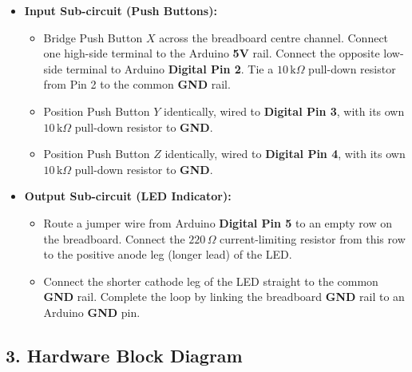 \documentclass[12pt, a4paper]{article}
\begin{document}
\begin{itemize}
  \item \textbf{Input Sub-circuit (Push Buttons):}
  \begin{itemize}
    \item Bridge Push Button $X$ across the breadboard centre channel.
          Connect one high-side terminal to the Arduino \textbf{5V} rail.
          Connect the opposite low-side terminal to Arduino
          \textbf{Digital Pin 2}. Tie a $10\,\text{k}\Omega$ pull-down
          resistor from Pin 2 to the common \textbf{GND} rail.
    \item Position Push Button $Y$ identically, wired to
          \textbf{Digital Pin 3}, with its own $10\,\text{k}\Omega$
          pull-down resistor to \textbf{GND}.
    \item Position Push Button $Z$ identically, wired to
          \textbf{Digital Pin 4}, with its own $10\,\text{k}\Omega$
          pull-down resistor to \textbf{GND}.
  \end{itemize}
  \item \textbf{Output Sub-circuit (LED Indicator):}
  \begin{itemize}
    \item Route a jumper wire from Arduino \textbf{Digital Pin 5} to an
          empty row on the breadboard. Connect the $220\,\Omega$
          current-limiting resistor from this row to the positive anode
          leg (longer lead) of the LED.
    \item Connect the shorter cathode leg of the LED straight to the
          common \textbf{GND} rail. Complete the loop by linking the
          breadboard \textbf{GND} rail to an Arduino \textbf{GND} pin.
  \end{itemize}
\end{itemize}

\subsection*{3. Hardware Block Diagram}
\end{document}

